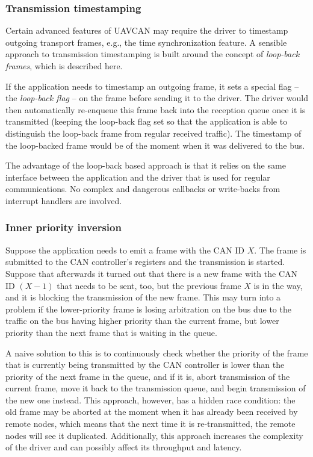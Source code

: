 \subsubsection{Transmission timestamping}

Certain advanced features of UAVCAN may require the driver to timestamp outgoing transport frames, e.g.,
the time synchronization feature.
A sensible approach to transmission timestamping is built around the concept of \emph{loop-back frames},
which is described here.

If the application needs to timestamp an outgoing frame, it sets a special flag -- the \emph{loop-back flag} --
on the frame before sending it to the driver.
The driver would then automatically re-enqueue this frame back into the reception queue once it is transmitted
(keeping the loop-back flag set so that the application is able to distinguish the loop-back
frame from regular received traffic).
The timestamp of the loop-backed frame would be of the moment when it was delivered to the bus.

The advantage of the loop-back based approach is that it relies on the same interface between
the application and the driver that is used for regular communications.
No complex and dangerous callbacks or write-backs from interrupt handlers are involved.

\subsubsection{Inner priority inversion}

Suppose the application needs to emit a frame with the CAN ID $X$.
The frame is submitted to the CAN controller's registers and the transmission is started.
Suppose that afterwards it turned out that there is a new frame with the CAN ID $(X-1)$ that needs to be sent,
too, but the previous frame $X$ is in the way, and it is blocking the transmission of the new frame.
This may turn into a problem if the lower-priority frame is losing arbitration on the bus due
to the traffic on the bus having higher priority than the current frame,
but lower priority than the next frame that is waiting in the queue.

A naive solution to this is to continuously check whether the priority of the frame that is currently being
transmitted by the CAN controller is lower than the priority of the next frame in the queue, and if it is,
abort transmission of the current frame, move it back to the transmission queue,
and begin transmission of the new one instead.
This approach, however, has a hidden race condition:
the old frame may be aborted at the moment when it has already been received by remote nodes,
which means that the next time it is re-transmitted, the remote nodes will see it duplicated.
Additionally, this approach increases the complexity of the driver and can possibly affect
its throughput and latency.

